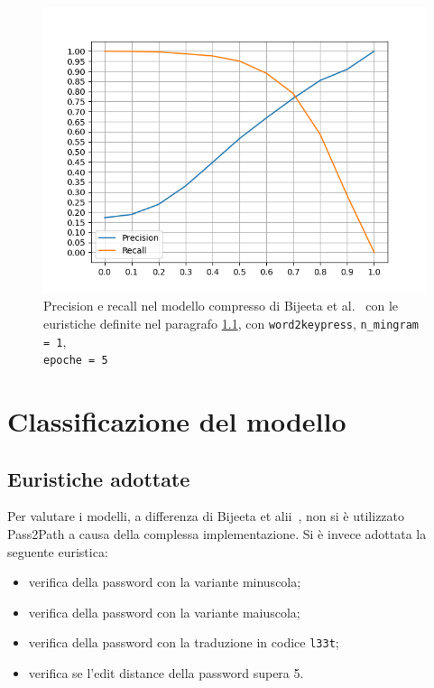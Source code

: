 \begin{figure}[H]
    \centering
    \includegraphics[width=11.5cm]{./immagini/CORRETTO_w2kp_nmingram=1_epochs=5.png}
    \caption{Precision e recall nel modello compresso di Bijeeta et al.~\cite{bijeeta} con le euristiche definite nel paragrafo \ref{sec:risultati euristiche adottate}, con \texttt{word2keypress}, \texttt{n\_mingram = 1},\\\texttt{epoche = 5}}
    \label{primomodello}
\end{figure}

\section{Classificazione del modello}
\label{sec:classificazione modello}
\subsection{Euristiche adottate}
\label{sec:risultati euristiche adottate}
Per valutare i modelli, a differenza di Bijeeta et alii~\cite{bijeeta}, non si è utilizzato Pass2Path a causa della complessa implementazione. Si è invece adottata la seguente euristica:
\begin{itemize}
    \item verifica della password con la variante minuscola;
    \item verifica della password con la variante maiuscola;
    \item verifica della password con la traduzione in codice \texttt{l33t};
    \item verifica se l'edit distance della password supera 5.
\end{itemize}

